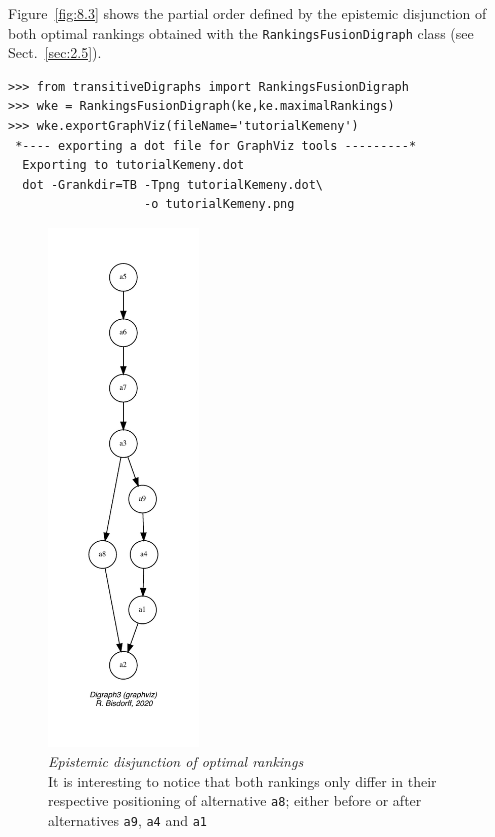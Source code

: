 Figure~\vref{fig:8.3} shows the partial order defined by the epistemic disjunction of both optimal \Kemeny rankings obtained with the \texttt{RankingsFu\-sionDigraph} class (see Sect.~\ref{sec:2.5}).
\begin{lstlisting}[caption={Computing the epistemic disjunction of all optimal \Kemeny rankings},label=list:8.10]   
>>> from transitiveDigraphs import RankingsFusionDigraph
>>> wke = RankingsFusionDigraph(ke,ke.maximalRankings)
>>> wke.exportGraphViz(fileName='tutorialKemeny')
 *---- exporting a dot file for GraphViz tools ---------*
  Exporting to tutorialKemeny.dot
  dot -Grankdir=TB -Tpng tutorialKemeny.dot\
                   -o tutorialKemeny.png
\end{lstlisting}
\begin{figure}[ht]
\sidecaption[t]
\includegraphics[width=4cm]{Figures/8-3-tutorialKemeny.pdf}
\caption[Epistemic disjunction of optimal \Kemeny rankings]{\emph{Epistemic disjunction of optimal \Kemeny rankings}\\ It is interesting to notice that both \Kemeny rankings only differ in their respective positioning of alternative \texttt{a8}; either before or after alternatives \texttt{a9}, \texttt{a4} and \texttt{a1}}
\label{fig:8.3}       %
\end{figure}

